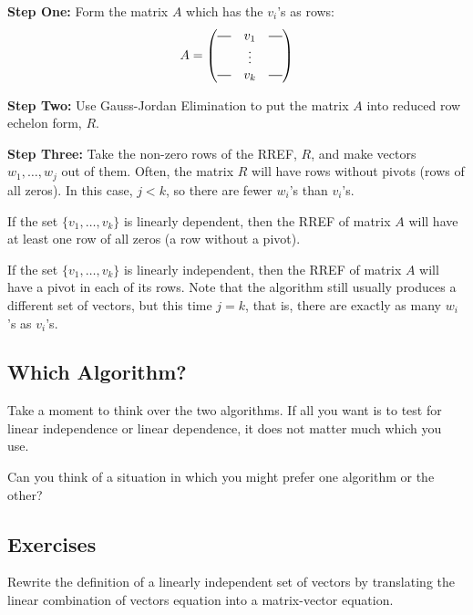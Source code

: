\documentclass[elementsmain.tex]{subfiles}
\begin{document}
\noindent
\textbf{Step One:} 
Form the matrix $A$ which has the $v_i$'s as rows:
\[
A = \begin{pmatrix} \horzbar & v_1 & \horzbar \\  & \vdots & \\ \horzbar & v_k & \horzbar \end{pmatrix}
\]

\noindent
\textbf{Step Two:} 
Use Gauss-Jordan Elimination to put the matrix $A$ into reduced row echelon form, $R$. 

\noindent
\textbf{Step Three:}
Take the non-zero rows of the RREF, $R$, and make vectors $w_1, \dots, w_j$ out of them. Often, the matrix $R$ will have rows without pivots (rows of all zeros). In this case, $j<k$, so there are fewer $w_i$'s than $v_i$'s.

\begin{theorem}\label{thm:16-row-alg}
If the set $\{v_1,\dots, v_k\}$ is linearly dependent, then the RREF of matrix $A$ will have at least one row of all zeros (a row without a pivot).

If the set $\{v_1, \dots, v_k\}$ is linearly independent, then the RREF of matrix $A$ will have a pivot in each of its rows. Note that the algorithm still usually produces a different set of vectors, but this time $j=k$, that is, there are exactly as many $w_i$'s as $v_i$'s.
\end{theorem}


\subsection*{Which Algorithm?}

Take a moment to think over the two algorithms. If all you want is to test for linear independence or linear dependence, it does not matter much which you use.

Can you think of a situation in which you might prefer one algorithm or the other?


\clearpage

\subsection*{Exercises}

\begin{exercise} Rewrite the definition of a linearly independent set of vectors by translating the linear combination of vectors equation into a matrix-vector equation.
\end{exercise}
\end{document}
